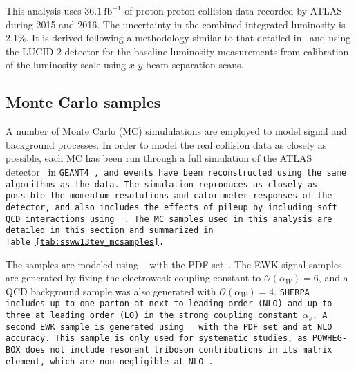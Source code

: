 This analysis uses $36.1~\textrm{fb}^{-1}$ of  proton-proton collision data recorded by ATLAS during 2015 and 2016.
The uncertainty in the combined integrated luminosity is 2.1\%. It is derived following a methodology similar to that detailed in~\cite{2016.atlas-luminosity-8tev} and using the LUCID-2 detector for the baseline luminosity measurements \cite{2018.atlas-luminosity-lucid2} from calibration of the luminosity scale using $x$-$y$ beam-separation scans. %

\subsection{Monte Carlo samples}\label{ssww13tev:mc}
A number of Monte Carlo (MC) simululations are employed to model signal and background processes.
In order to model the real collision data as closely as possible, each MC has been run through a full simulation of the ATLAS detector~\cite{2010.ATLAS-simulation-infrastructure} in \tt{GEANT4}~\cite{2003.GEANT4}, and events have been reconstructed using the same algorithms as the data.
The simulation reproduces as closely as possible the momentum resolutions and calorimeter responses of the detector, and also includes the effects of pileup by including soft QCD interactions using ~\cite{2008.Pythia8}.
The MC samples used in this analysis are detailed in this section and summarized in Table~\ref{tab:ssww13tev_mcsamples}.

The \ssww samples are modeled using ~\cite{2009.Sherpa, 2008.CS_Shower, 2009.METS} with the \nnpdf PDF set~\cite{2015.NNPDF3}.
The EWK signal samples are generated by fixing the electroweak coupling constant to $\mathcal{O}(\alpha_W) = 6$, and a QCD background sample was also generated with $\mathcal{O}(\alpha_W) = 4$.
\tt{SHERPA} includes up to one parton at next-to-leading order (NLO) and up to three at leading order (LO) in the strong coupling constant $\alpha_s$.
A second \ssww EWK sample is generated using ~\cite{2010.powhegbox} with the \nnpdf PDF set and at NLO accuracy.
This sample is only used for systematic studies, as \tt{POWHEG-BOX} does not include resonant triboson contributions in its matrix element, which are non-negligible at NLO~\cite{2018.ssww-scattering-at-lhc}.

